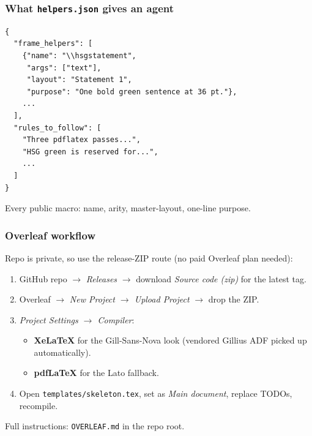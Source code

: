 \documentclass[aspectratio=169]{beamer}
\begin{document}
\begin{frame}[t,fragile]
  \frametitle{What \texttt{helpers.json} gives an agent}

  \begin{lstlisting}
{
  "frame_helpers": [
    {"name": "\\hsgstatement",
     "args": ["text"],
     "layout": "Statement 1",
     "purpose": "One bold green sentence at 36 pt."},
    ...
  ],
  "rules_to_follow": [
    "Three pdflatex passes...",
    "HSG green is reserved for...",
    ...
  ]
}
  \end{lstlisting}

  Every public macro: name, arity, master-layout, one-line purpose.
\end{frame}

\begin{frame}[t,fragile]
  \frametitle{Overleaf workflow}

  Repo is private, so use the release-ZIP route (no paid Overleaf
  plan needed):

  \begin{enumerate}
    \setlength\itemsep{0.2em}
    \item GitHub repo $\rightarrow$ \emph{Releases} $\rightarrow$
          download \emph{Source code (zip)} for the latest tag.
    \item Overleaf $\rightarrow$ \emph{New Project $\rightarrow$ Upload
          Project} $\rightarrow$ drop the ZIP.
    \item \emph{Project Settings $\rightarrow$ Compiler}:
          \begin{itemize}\setlength\itemsep{0pt}
            \item \textbf{XeLaTeX} for the Gill-Sans-Nova look
                  (vendored Gillius ADF picked up automatically).
            \item \textbf{pdfLaTeX} for the Lato fallback.
          \end{itemize}
    \item Open \texttt{templates/skeleton.tex}, set as
          \emph{Main document}, replace TODOs, recompile.
  \end{enumerate}

  Full instructions: \texttt{OVERLEAF.md} in the repo root.
\end{frame}

\end{document}
